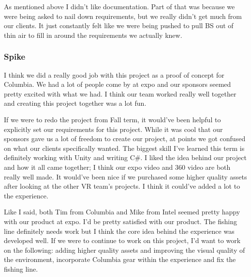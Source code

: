 \documentclass[10pt,journal,compsoc,onecolumn, draftclsnofoot]{IEEEtran}
\begin{document}
As mentioned above I didn't like documentation. Part of that was because we were being asked to nail down requirements, but we really didn't get much from our clients. It just constantly felt like we were being pushed to pull BS out of thin air to fill in around the requirements we actually knew.

\subsubsection{Spike}

I think we did a really good job with this project as a proof of concept for Columbia. We had a lot of people come by at expo and our sponsors seemed pretty excited with what we had. I think our team worked really well together and creating this project together was a lot fun.

If we were to redo the project from Fall term, it would've been helpful to explicitly set our requirements for this project. While it was cool that our sponsors gave us a lot of freedom to create our project, at points we got confused on what our clients specifically wanted. The biggest skill I've learned this term is definitely working with Unity and writing C\#. I liked the idea behind our project and how it all came together; I think our expo video and 360 video are both really well made. It would've been nice if we purchased some higher quality assets after looking at the other VR team's projects. I think it could've added a lot to the experience.

Like I said, both Tim from Columbia and Mike from Intel seemed pretty happy with our product at expo. I'd be pretty satisfied with our product. The fishing line definitely needs work but I think the core idea behind the experience was developed well. If we were to continue to work on this project, I'd want to work on the following: adding higher quality assets and improving the visual quality of the environment, incorporate Columbia gear within the experience and fix the fishing line.

\clearpage

\vspace*{\fill}
\section*{}
\vspace*{\fill}


\end{document}
